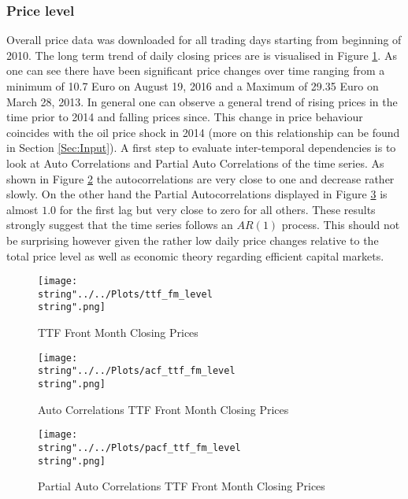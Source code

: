 \subsubsection{Price level}
Overall price data was downloaded for all trading days starting from beginning of 2010. The long term trend of daily closing prices are is visualised in Figure \ref{fig:ttf_fm_level}. As one can see there have been significant price changes over time ranging from a minimum of 10.7 Euro on August 19, 2016 and a Maximum of 29.35 Euro on March 28, 2013. In general one can observe a general trend of rising prices in the time prior to 2014 and falling prices since. This change in price behaviour coincides with the oil price shock in 2014 (more on this relationship can be found in Section \ref{Sec:Input}). A first step to evaluate inter-temporal dependencies is to look at Auto Correlations and Partial Auto Correlations of the time series. As shown in Figure \ref{fig:acf_ttf_fm_level} the autocorrelations are very close to one and decrease rather slowly. On the other hand the Partial Autocorrelations displayed in Figure \ref{fig:pacf_ttf_fm_level} is almost $1.0$ for the first lag but very close to zero for all others. These results strongly suggest that the time series follows an $AR(1)$ process. This should not be surprising however given the rather low daily price changes relative to the total price level as well as economic theory regarding efficient capital markets.


\begin{figure}
  \centering
\texttt{[image: \\string"../../Plots/ttf\_fm\_level\\string".png]}
  \caption{TTF Front Month Closing Prices}\label{fig:ttf_fm_level}
\end{figure}


\begin{figure}
  \centering
\texttt{[image: \\string"../../Plots/acf\_ttf\_fm\_level\\string".png]}
  \caption{Auto Correlations TTF Front Month Closing Prices}\label{fig:acf_ttf_fm_level}
\end{figure}

\begin{figure}
  \centering
\texttt{[image: \\string"../../Plots/pacf\_ttf\_fm\_level\\string".png]}
  \caption{Partial Auto Correlations TTF Front Month Closing Prices}\label{fig:pacf_ttf_fm_level}
\end{figure}

